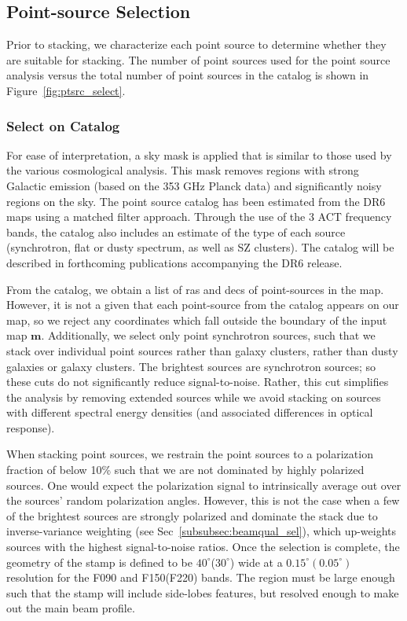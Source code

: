 \subsection{Point-source Selection}
\label{subsec:ptsrc_sel}
Prior to stacking, we characterize each point source to determine whether they are suitable for stacking.  The number of point sources used for the point source analysis versus the total number of point sources in the catalog is shown in Figure~\ref{fig:ptsrc_select}.

\subsubsection{Select on Catalog}
\label{subsubsec:cat_sel}
For ease of interpretation, a sky mask is applied that is similar to those used by the various cosmological analysis. This mask removes regions with strong Galactic emission (based on the 353 GHz Planck data) and significantly noisy regions on the sky.  The point source catalog has been estimated from the DR6 maps using a matched filter approach. Through the use of the 3 ACT frequency bands, the catalog also includes an estimate of the type of each source (synchrotron, flat or dusty spectrum, as well as SZ clusters). The catalog will be described in forthcoming publications accompanying the DR6 release.

From the catalog, we obtain a list of ras and decs of point-sources in the map.  However, it is not a given that each point-source from the catalog appears on our map, so we reject any coordinates which fall outside the boundary of the input map $\mathbf m$.  Additionally, we select only point synchrotron sources, such that we stack over individual point sources rather than galaxy clusters, rather than dusty galaxies or galaxy clusters.  The brightest sources are synchrotron sources; so these cuts do not significantly reduce signal-to-noise.  Rather, this cut simplifies the analysis by removing extended sources while we avoid stacking on sources with different spectral energy densities (and associated differences in optical response).

When stacking point sources, we restrain the point sources to a polarization fraction of below 10\% such that we are not dominated by highly polarized sources.  One would expect the polarization signal to intrinsically average out over the sources' random polarization angles.  However, this is not the case when a few of the brightest sources are strongly polarized and dominate the stack due to inverse-variance weighting (see Sec~\ref{subsubsec:beamqual_sel}), which up-weights sources with the highest signal-to-noise ratios.  Once the selection is complete, the geometry of the stamp is defined to be $40^{\circ}$($30^{\circ}$) wide at a $0.15^{\circ}(0.05^{\circ})$ resolution for the F090 and F150(F220) bands.  The region must be large enough such that the stamp will include side-lobes features, but resolved enough to make out the main beam profile.

